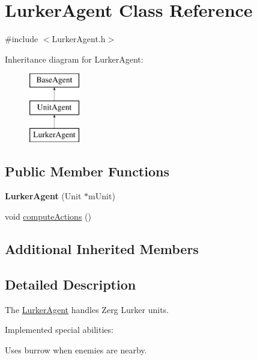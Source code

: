 \hypertarget{class_lurker_agent}{\section{Lurker\-Agent Class Reference}
\label{class_lurker_agent}
}


{\ttfamily \#include $<$Lurker\-Agent.\-h$>$}

Inheritance diagram for Lurker\-Agent\-:\begin{figure}[H]
\begin{center}
\leavevmode
\includegraphics[height=3.000000cm]{class_lurker_agent}
\end{center}
\end{figure}
\subsection*{Public Member Functions}
\begin{DoxyCompactItemize}
\item 
\hypertarget{class_lurker_agent_a8ae651c18d1a918b8264c4857df19cb8}{{\bfseries Lurker\-Agent} (Unit $\ast$m\-Unit)}\label{class_lurker_agent_a8ae651c18d1a918b8264c4857df19cb8}

\item 
void \hyperlink{class_lurker_agent_a0bc09de792eac29436d93c0d47842038}{compute\-Actions} ()
\end{DoxyCompactItemize}
\subsection*{Additional Inherited Members}


\subsection{Detailed Description}
The \hyperlink{class_lurker_agent}{Lurker\-Agent} handles Zerg Lurker units.

Implemented special abilities\-:
\begin{DoxyItemize}
\item Uses burrow when enemies are nearby.
\end{DoxyItemize}

